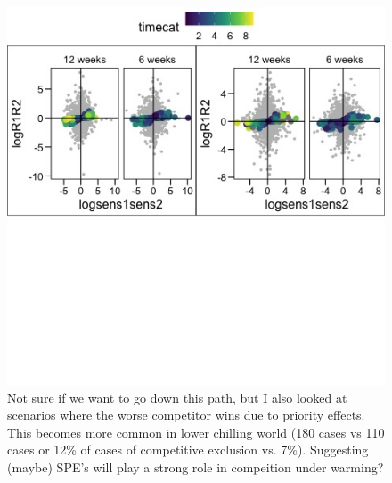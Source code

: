 \documentclass{article}
\begin{document}
\begin{figure}[h!]
  \centering
 \includegraphics[width=\textwidth]{..//plots/dominance.jpeg}
    \caption{Not sure if we want to go down this path, but I also looked at scenarios where the worse competitor wins due to priority effects. This becomes more common in lower chilling world (180 cases vs 110 cases or 12\% of cases of competitive exclusion vs. 7\%). Suggesting (maybe) SPE's will play a strong role in compeition under warming?}
    \label{Fig:differences}
\end{figure}
\end{document}
